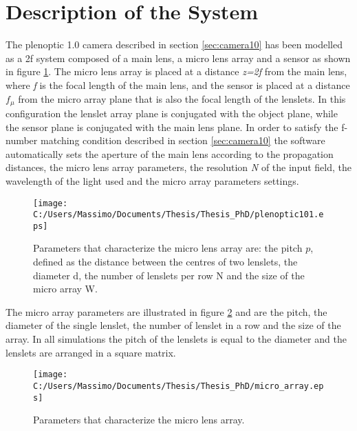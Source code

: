 \section{Description of the System}
\label{sec:system10}
The plenoptic 1.0 camera described in section \ref{sec:camera10} has been modelled as a 2f system composed of a main lens, a micro lens array and a sensor as shown in figure \ref{fig:pleno10_system}. The micro lens array is placed at a distance \textit{z=2f} from the main lens, where \textit{f} is the focal length of the main lens, and the sensor is placed at a distance $f_\mu$ from the micro array plane that is also the focal length of the lenslets. In this configuration the lenslet array plane is conjugated with the object plane, while the sensor plane is conjugated with the main lens plane. In order to satisfy the f-number matching condition described in section \ref{sec:camera10} the software automatically sets the aperture of the main lens according to the propagation distances, the micro lens array parameters, the resolution \textit{N} of the input field, the wavelength of the light used and the micro array parameters settings. 
\begin{figure}[H]
	\centering
	\texttt{[image: C:/Users/Massimo/Documents/Thesis/Thesis\_PhD/plenoptic101.eps]}
	\caption{\label{fig:pleno10_system} Parameters that characterize the micro lens array are: the pitch $p$, defined as the distance between the centres of two lenslets, the diameter d, the number of lenslets per row N and the size of the micro array W. }
\end{figure}
The micro array parameters are illustrated in figure \ref{fig:microarray1} and are the pitch, the diameter of the single lenslet, the number of lenslet in a row and the size of the array. In all simulations the pitch of the lenslets is equal to the diameter and the lenslets are arranged in a square matrix. 
\begin{figure}[H]
	\centering
	\texttt{[image: C:/Users/Massimo/Documents/Thesis/Thesis\_PhD/micro\_array.eps]}
	\caption{\label{fig:microarray1} Parameters that characterize the micro lens array. }
\end{figure}
